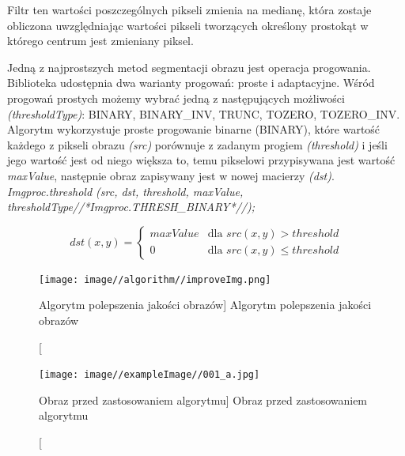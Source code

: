 \documentclass[a4paper,12pt]{article}
\begin{document}
                Filtr ten wartości poszczególnych pikseli zmienia na medianę, która zostaje obliczona uwzględniając wartości pikseli tworzących określony prostokąt w którego centrum jest zmieniany piksel. 
                
			    Jedną z najprostszych metod segmentacji obrazu jest operacja progowania.  Biblioteka udostępnia dwa warianty progowań: proste i adaptacyjne. 
			    Wśród progowań prostych możemy wybrać jedną z następujących możliwości  \textit{(thresholdType)}: BINARY, BINARY\_INV, TRUNC, TOZERO, TOZERO\_INV.
			    Algorytm wykorzystuje proste progowanie binarne (BINARY), które wartość każdego z pikseli obrazu \textit{(src)} porównuje z zadanym progiem \textit{(threshold)} i jeśli jego wartość jest od niego większa to, temu pikselowi przypisywana jest wartość \textit{maxValue}, następnie obraz zapisywany jest w nowej macierzy \textit{(dst)}.\\
			    \textit{Imgproc.threshold (src, dst, threshold, maxValue, thresholdType//*Imgproc.THRESH\_BINARY*//);}
			    
			    \begin{displaymath}
                    dst (x, y) =  
                    \left\{
                        \begin{array}{ll}
                            maxValue & \textrm{dla } src (x, y) > threshold \\
                            0 & \textrm{dla } src (x, y) \leqslant threshold
                        \end{array}
                    \right.
                \end{displaymath}
			    
			    \newpage
    		    
    		    \begin{figure}[!ht]  
    			    \begin{center}
    			        \texttt{[image: image//algorithm//improveImg.png]}%
    			    \end{center}
    			    \caption
        			    [Algorytm polepszenia jakości obrazów]  
	    		        {Algorytm polepszenia jakości obrazów} 
	    		        \label{fig:betterImg}
    		    \end{figure}
		
                \newpage
		
    		    \begin{figure}[!ht]  
    			    \begin{center}
    				    \texttt{[image: image//exampleImage//001\_a.jpg]} 
    			    \end{center}
    			    \caption
        			    [Obraz przed zastosowaniem algorytmu]  
                        {Obraz przed zastosowaniem algorytmu}  
    		    \end{figure}
		
\end{document}
